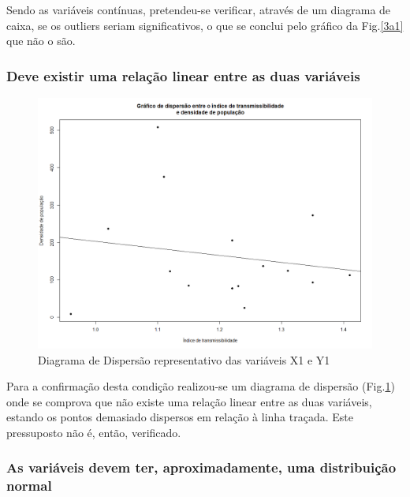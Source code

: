 \documentclass[conference]{IEEEtran}
\begin{document}
Sendo as variáveis contínuas, pretendeu-se verificar, através de um diagrama de caixa, se os outliers seriam significativos, o que se conclui pelo gráfico da Fig.\ref{3a1} que não o são.

\subsubsection{Deve existir uma relação linear entre as duas variáveis}

\begin{figure}[htbp]
\centerline{\includegraphics[width=0.95\columnwidth]{images/03.a.2.png}}
\caption{Diagrama de Dispersão representativo das variáveis X1 e Y1}
\label{3a2}
\end{figure}

Para a confirmação desta condição realizou-se um diagrama de dispersão (Fig.\ref{3a2}) onde se comprova que não existe uma relação linear entre as duas variáveis, estando os pontos demasiado dispersos em relação à linha traçada. Este pressuposto não é, então, verificado.

\subsubsection{As variáveis devem ter, aproximadamente, uma distribuição normal}
\end{document}
